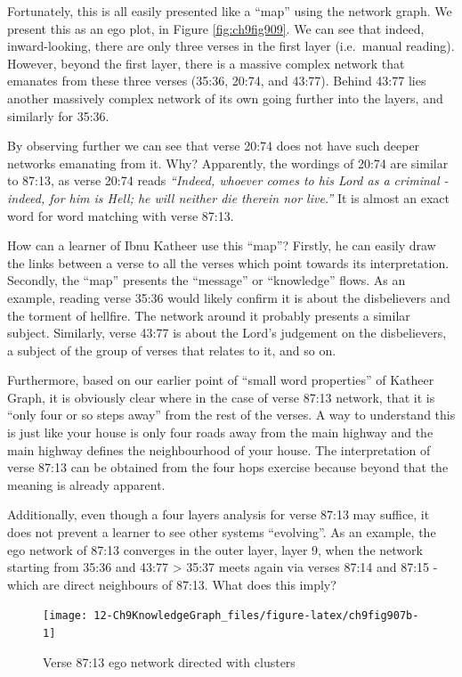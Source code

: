 \documentclass[
]{article}
\begin{document}
Fortunately, this is all easily presented like a ``map'' using the network graph. We present this as an ego plot, in Figure \ref{fig:ch9fig909}. We can see that indeed, inward-looking, there are only three verses in the first layer (i.e.~manual reading). However, beyond the first layer, there is a massive complex network that emanates from these three verses (35:36, 20:74, and 43:77). Behind 43:77 lies another massively complex network of its own going further into the layers, and similarly for 35:36.

By observing further we can see that verse 20:74 does not have such deeper networks emanating from it. Why? Apparently, the wordings of 20:74 are similar to 87:13, as verse 20:74 reads \emph{``Indeed, whoever comes to his Lord as a criminal - indeed, for him is Hell; he will neither die therein nor live.''} It is almost an exact word for word matching with verse 87:13.

How can a learner of Ibnu Katheer use this ``map''? Firstly, he can easily draw the links between a verse to all the verses which point towards its interpretation. Secondly, the ``map'' presents the ``message'' or ``knowledge'' flows. As an example, reading verse 35:36 would likely confirm it is about the disbelievers and the torment of hellfire. The network around it probably presents a similar subject. Similarly, verse 43:77 is about the Lord's judgement on the disbelievers, a subject of the group of verses that relates to it, and so on.

Furthermore, based on our earlier point of ``small word properties'' of Katheer Graph, it is obviously clear where in the case of verse 87:13 network, that it is ``only four or so steps away'' from the rest of the verses. A way to understand this is just like your house is only four roads away from the main highway and the main highway defines the neighbourhood of your house. The interpretation of verse 87:13 can be obtained from the four hops exercise because beyond that the meaning is already apparent.

Additionally, even though a four layers analysis for verse 87:13 may suffice, it does not prevent a learner to see other systems ``evolving''. As an example, the ego network of 87:13 converges in the outer layer, layer 9, when the network starting from 35:36 and 43:77 \textgreater{} 35:37 meets again via verses 87:14 and 87:15 - which are direct neighbours of 87:13. What does this imply?

\begin{figure}

{\centering \texttt{[image: 12-Ch9KnowledgeGraph\_files/figure-latex/ch9fig907b-1]} 

}

\caption{Verse 87:13 ego network directed with clusters}\label{fig:ch9fig907b}
\end{figure}
\end{document}
